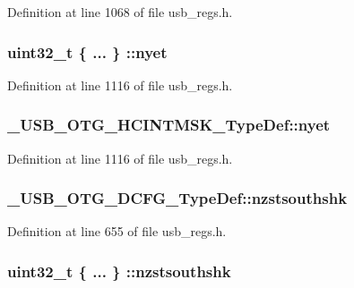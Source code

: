 Definition at line 1068 of file usb\-\_\-regs.\-h.

\hypertarget{group___u_s_b___o_t_g___d_r_i_v_e_r_gaaac8c16e1a9a20c10fedc2c1e9231b3a}{
\subsubsection[{nyet}]{\setlength{\rightskip}{0pt plus 5cm}uint32\-\_\-t \{ ... \} \-::nyet}}\label{group___u_s_b___o_t_g___d_r_i_v_e_r_gaaac8c16e1a9a20c10fedc2c1e9231b3a}


Definition at line 1116 of file usb\-\_\-regs.\-h.

\hypertarget{group___u_s_b___o_t_g___d_r_i_v_e_r_ga34610fba93509474e4236783355355a6}{
\subsubsection[{nyet}]{ \-\_\-\-U\-S\-B\-\_\-\-O\-T\-G\-\_\-\-H\-C\-I\-N\-T\-M\-S\-K\-\_\-\-Type\-Def\-::nyet}}\label{group___u_s_b___o_t_g___d_r_i_v_e_r_ga34610fba93509474e4236783355355a6}


Definition at line 1116 of file usb\-\_\-regs.\-h.

\hypertarget{group___u_s_b___o_t_g___d_r_i_v_e_r_ga7fd4cbb8c5ed0671b331e75c3b6d45ae}{
\subsubsection[{nzstsouthshk}]{ \-\_\-\-U\-S\-B\-\_\-\-O\-T\-G\-\_\-\-D\-C\-F\-G\-\_\-\-Type\-Def\-::nzstsouthshk}}\label{group___u_s_b___o_t_g___d_r_i_v_e_r_ga7fd4cbb8c5ed0671b331e75c3b6d45ae}


Definition at line 655 of file usb\-\_\-regs.\-h.

\hypertarget{group___u_s_b___o_t_g___d_r_i_v_e_r_ga91f75c689a6b3cc9a513aa42ed4a942a}{
\subsubsection[{nzstsouthshk}]{\setlength{\rightskip}{0pt plus 5cm}uint32\-\_\-t \{ ... \} \-::nzstsouthshk}}\label{group___u_s_b___o_t_g___d_r_i_v_e_r_ga91f75c689a6b3cc9a513aa42ed4a942a}


